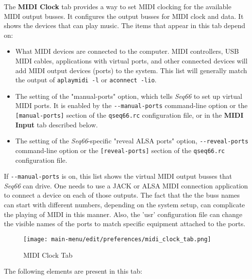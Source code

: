    The \textbf{MIDI Clock} tab provides a way to set MIDI clocking for
   the available MIDI output busses.
   It configures the output busses for MIDI clock and data.
   It shows the devices that can play music.
   The items that appear in this tab depend on:

   \begin{itemize}
      \item What MIDI devices are connected to the computer.
         MIDI controllers, USB MIDI cables, applications with virtual
         ports, and other connected devices will add MIDI
         output devices (ports) to the system.
         This list will generally match the output of \texttt{aplaymidi -l}
         or \texttt{aconnect -lio}.
      \item The setting of the "manual-ports" option, which tells
         \textsl{Seq66} to set up virtual MIDI ports.
         It is enabled by the
         \texttt{-{}-manual-ports} command-line option or the
         \texttt{[manual-ports]} section of the
         \texttt{qseq66.rc} configuration file,
         or in the \textbf{MIDI Input} tab described below.
      \item The setting of the \textsl{Seq66}-specific
         "reveal ALSA ports" option,
         \texttt{-{}-reveal-ports} command-line option or the
         \texttt{[reveal-ports]} section of the
         \texttt{qseq66.rc} configuration file.
   \end{itemize}

   If \texttt{-{}-manual-ports} is on, this list shows the virtual
   MIDI output busses that \textsl{Seq66} can drive.
   One needs to use a JACK or ALSA MIDI
   connection application to connect a device on each of those outputs.
   The fact that the the buss names can
   start with different numbers, depending on the system setup, can complicate
   the playing of MIDI in this manner.  Also, the 'usr' configuration file can
   change the visible names of the ports to match specific equipment attached
   to the ports.

\begin{figure}[H]
   \centering 
   \texttt{[image: main-menu/edit/preferences/midi\_clock\_tab.png]}
   \caption{MIDI Clock Tab}
   \label{fig:midi_clock_tab}
\end{figure}

   The following elements are present in this tab:

